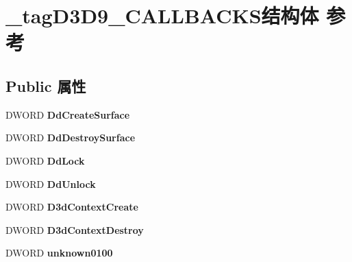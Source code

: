 \hypertarget{struct__tag_d3_d9___c_a_l_l_b_a_c_k_s}{}\section{\+\_\+tag\+D3\+D9\+\_\+\+C\+A\+L\+L\+B\+A\+C\+K\+S结构体 参考}
\label{struct__tag_d3_d9___c_a_l_l_b_a_c_k_s}
\subsection*{Public 属性}
\begin{DoxyCompactItemize}
\item 
\mbox{\label{struct__tag_d3_d9___c_a_l_l_b_a_c_k_s_a9aaa70b5b4c20e363901beb356d373b6}} 
D\+W\+O\+RD {\bfseries Dd\+Create\+Surface}
\item 
\mbox{\label{struct__tag_d3_d9___c_a_l_l_b_a_c_k_s_a79ac908bd38c5a07a0434b341bd284af}} 
D\+W\+O\+RD {\bfseries Dd\+Destroy\+Surface}
\item 
\mbox{\label{struct__tag_d3_d9___c_a_l_l_b_a_c_k_s_a1d5d892aeaf252d03f595ff6fa50ec92}} 
D\+W\+O\+RD {\bfseries Dd\+Lock}
\item 
\mbox{\label{struct__tag_d3_d9___c_a_l_l_b_a_c_k_s_ade61794d61776fe90ff2a5da9334d9f5}} 
D\+W\+O\+RD {\bfseries Dd\+Unlock}
\item 
\mbox{\label{struct__tag_d3_d9___c_a_l_l_b_a_c_k_s_a2ec26286ea106674d33e2fed8999e111}} 
D\+W\+O\+RD {\bfseries D3d\+Context\+Create}
\item 
\mbox{\label{struct__tag_d3_d9___c_a_l_l_b_a_c_k_s_a64f3e3acd6f1eea97c8bb4bd25f1bdc7}} 
D\+W\+O\+RD {\bfseries D3d\+Context\+Destroy}
\item 
\mbox{\label{struct__tag_d3_d9___c_a_l_l_b_a_c_k_s_a67ff8b5f0941e81872d647edcbaaa804}} 
D\+W\+O\+RD {\bfseries unknown0100}
\item 
\mbox{\label{struct__tag_d3_d9___c_a_l_l_b_a_c_k_s_abd33902d23b2f53ea7e6f98ff81bb5de}} 

\end{DoxyCompactItemize}
